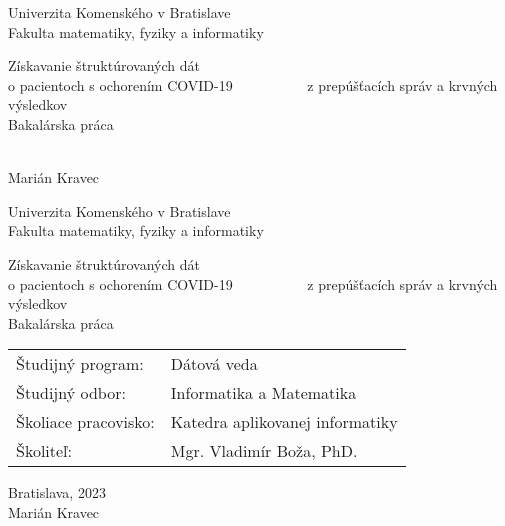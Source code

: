 \documentclass[12pt, twoside]{book}
\def\mfrok{2023}
\def\mfnazov{Získavanie štruktúrovaných dát \\o pacientoch s ochorením COVID-19 ~~~~~~~~~~z prepúšťacích správ a krvných výsledkov}
\def\mftyp{Bakalárska práca}
\def\mfautor{Marián Kravec}
\def\mfskolitel{Mgr. Vladimír Boža, PhD.}
\def\mfkonzultant{tit. Meno Priezvisko, tit. }
\def\mfmiesto{Bratislava, \mfrok}
\def\mfodbor{ Informatika a Matematika }
\def\program{ Dátová veda }
\def\mfpracovisko{ Katedra aplikovanej informatiky }
\begin{document}
     
\frontmatter
\pagestyle{empty}


\begin{center}
\sc\large
Univerzita Komenského v Bratislave\\
Fakulta matematiky, fyziky a informatiky

\vfill

{\LARGE\mfnazov}\\
\mftyp
\end{center}

\vfill

{\sc\large 
\noindent \mfrok\\
\mfautor
}

\cleardoublepage



\noindent

\begin{center}
\sc  
\large
Univerzita Komenského v Bratislave\\
Fakulta matematiky, fyziky a informatiky

\vfill

{\LARGE\mfnazov}\\
\mftyp
\end{center}

\vfill

\noindent
\begin{tabular}{ll}
Študijný program: & \program \\
Študijný odbor: & \mfodbor \\
Školiace pracovisko: & \mfpracovisko \\
Školiteľ: & \mfskolitel \\
\end{tabular}

\vfill


\noindent \mfmiesto\\
\mfautor

\cleardoublepage



\newpage 
\setcounter{page}{2}

\end{document}
